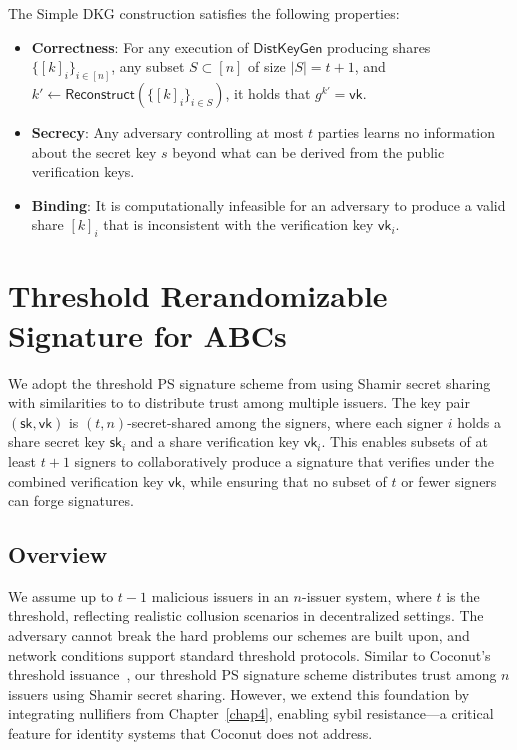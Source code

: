 \begin{theorem}
The Simple DKG construction satisfies the following properties:
\begin{itemize}
\item \textbf{Correctness}: For any execution of $\mathsf{DistKeyGen}$ producing shares $\{[k]_i\}_{i \in [n]}$, any subset $S \subset [n]$ of size $|S| = t+1$, and $k' \leftarrow \mathsf{Reconstruct}(\{[k]_i\}_{i \in S})$, it holds that $g^{k'} = \mathsf{vk}$.
\item \textbf{Secrecy}: Any adversary controlling at most $t$ parties learns no information about the secret key $s$ beyond what can be derived from the public verification keys.
\item \textbf{Binding}: It is computationally infeasible for an adversary to produce a valid share $[k]_i$ that is inconsistent with the verification key $\mathsf{vk}_i$.
\end{itemize}
\end{theorem}





\section{Threshold Rerandomizable Signature for ABCs}
\label{sec:threshold-construction}

We adopt the threshold PS signature scheme from \cite{tomescu_utt_2022} using Shamir secret sharing with similarities to \cite{sonnino_coconut_2020} to distribute trust among multiple issuers. The key pair $(\mathsf{sk}, \mathsf{vk})$ is $(t,n)$-secret-shared among the signers, where each signer $i$ holds a share secret key $\mathsf{sk}_i$ and a share verification key $\mathsf{vk}_i$. This enables subsets of at least $t+1$ signers to collaboratively produce a signature that verifies under the combined verification key $\mathsf{vk}$, while ensuring that no subset of $t$ or fewer signers can forge signatures.


\subsection{Overview}
We assume up to $t-1$ malicious issuers in an $n$-issuer system, where $t$ is the threshold, reflecting realistic collusion scenarios in decentralized settings. The adversary cannot break the hard problems our schemes are built upon, and network conditions support standard threshold protocols. Similar to Coconut’s threshold issuance~\cite{sonnino_coconut_2020}, our threshold PS signature scheme distributes trust among $n$ issuers using Shamir secret sharing. However, we extend this foundation by integrating nullifiers from Chapter~\ref{chap4}, enabling sybil resistance—a critical feature for identity systems that Coconut does not address.

